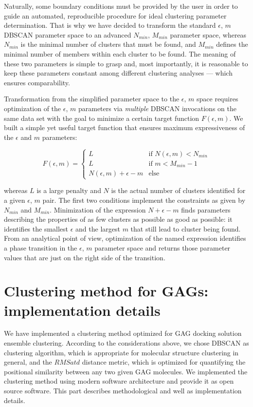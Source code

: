 Naturally, some boundary conditions must be provided by the user in order to
guide an automated, reproducible procedure for ideal clustering parameter
determination. That is why we have decided to transform the standard $\epsilon$,
$m$ DBSCAN parameter space to an advanced $N_{min}$, $M_{min}$ parameter space,
whereas $N_{min}$ is the minimal number of clusters that must be found, and
$M_{min}$ defines the minimal number of members within each cluster to be found.
The meaning of these two parameters is simple to grasp and, most importantly, it
is reasonable to keep these parameters constant among different clustering
analyses --- which ensures comparability.

Transformation from the simplified parameter space to the $\epsilon$, $m$ space
requires optimization of the $\epsilon$, $m$ parameters via \textit{multiple}
DBSCAN invocations on the same data set with the goal to minimize a certain
target function $F(\epsilon, m)$. We built a simple yet useful target function
that ensures maximum expressiveness of the $\epsilon$ and $m$ parameters:

\begin{equation}
F(\epsilon, m) =
\begin{cases}
L & \text{if } N(\epsilon, m) < N_{min} \\
L & \text{if } m < M_{min}-1 \\
N(\epsilon, m) + \epsilon - m & \text{else}
\end{cases}
\end{equation}

whereas $L$ is a large penalty and $N$ is the actual number of clusters
identified for a given $\epsilon$, $m$ pair. The first two conditions implement
the constraints as given by $N_{min}$ and $M_{min}$. Minimization of the
expression $N + \epsilon - m$ finds parameters describing the properties of as
few clusters as possible as good as possible: it identifies the smallest
$\epsilon$ and the largest $m$ that still lead to cluster being found. From an
analytical point of view, optimization of the named expression identifies a
phase transition in the $\epsilon$, $m$ parameter space and returns those
parameter values that are just on the right side of the transition.


\section{Clustering method for GAGs: implementation details}

We have implemented a clustering method optimized for GAG docking solution
ensemble clustering. According to the considerations above, we chose DBSCAN as
clustering algorithm, which is appropriate for molecular structure clustering in
general, and the $RMSatd$ distance metric, which is optimized for quantifying
the positional similarity between any two given GAG molecules. We implemented
the clustering method using modern software architecture and provide it as open
source software. This part describes methodological and well as implementation
details.

